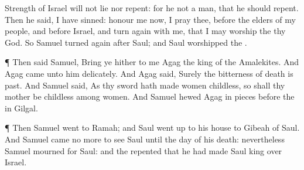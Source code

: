 {Strength of
Israel will not
lie nor
repent: for he
{} not a
man, that he should
repent.
Then he
said, I have
sinned:
{}
honour me now, I pray thee, before the
elders of my
people, and before
Israel, and turn
again with me, that I may
worship the
{} thy
God.
So
Samuel turned
again
after
Saul; and
Saul
worshipped the
{}.
\par }{\PP {}¶ Then
said
Samuel, Bring ye
hither to me
Agag the
king of the
Amalekites. And
Agag
came unto him
delicately. And
Agag
said,
Surely the
bitterness of
death is
past.
And
Samuel
said, As thy
sword hath made
women
childless, so shall thy
mother be
childless among
women. And
Samuel
hewed
Agag in
pieces
before the
{} in
Gilgal.
\par }{\PP {}¶ Then
Samuel
went to
Ramah; and
Saul went
up to his
house to
Gibeah of
Saul.
And
Samuel came no
more to
see
Saul until the
day of his
death:
nevertheless
Samuel
mourned for
Saul: and the
{}
repented that he had made
Saul
king over
Israel.

}
